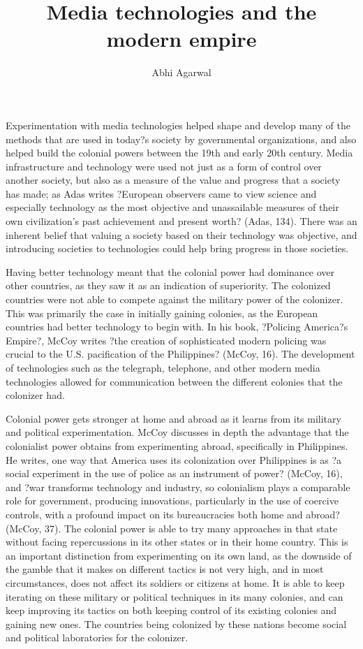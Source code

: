 \documentclass[12pt, oneside]{article}
\title{Media technologies and the modern empire\vspace{-0.4cm}}
\author{Abhi Agarwal\vspace{-1cm}}
\date{}
\begin{document}
\maketitle

\par Experimentation with media technologies helped shape and develop many of the methods that are used in today?s society by governmental organizations, and also helped build the colonial powers between the 19th and early 20th century. Media infrastructure and technology were used not just as a form of control over another society, but also as a measure of the value and progress that a society has made; as Adas writes ?European observers came to view science and especially technology as the most objective and unassailable measures of their own civilization's past achievement and present worth? (Adas, 134). There was an inherent belief that valuing a society based on their technology was objective, and introducing societies to technologies could help bring progress in those societies.
\par Having better technology meant that the colonial power had dominance over other countries, as they saw it as an indication of superiority. The colonized countries were not able to compete against the military power of the colonizer. This was primarily the case in initially gaining colonies, as the European countries had better technology to begin with. In his book, ?Policing America?s Empire?, McCoy writes ?the creation of sophisticated modern policing was crucial to the U.S. pacification of the Philippines? (McCoy, 16). The development of technologies such as the telegraph, telephone, and other modern media technologies allowed for communication between the different colonies that the colonizer had. 
\par Colonial power gets stronger at home and abroad as it learns from its military and political experimentation. McCoy discusses in depth the advantage that the colonialist power obtains from experimenting abroad, specifically in Philippines. He writes, one way that America uses its colonization over Philippines is as ?a social experiment in the use of police as an instrument of power? (McCoy, 16), and ?war transforms technology and industry, so colonialism plays a comparable role for government, producing innovations, particularly in the use of coercive controls, with a profound impact on its bureaucracies both home and abroad? (McCoy, 37). The colonial power is able to try many approaches in that state without facing repercussions in its other states or in their home country. This is an important distinction from experimenting on its own land, as the downside of the gamble that it makes on different tactics is not very high, and in most circumstances, does not affect its soldiers or citizens at home. It is able to keep iterating on these military or political techniques in its many colonies, and can keep improving its tactics on both keeping control of its existing colonies and gaining new ones. The countries being colonized by these nations become social and political laboratories for the colonizer.
\end{document}
